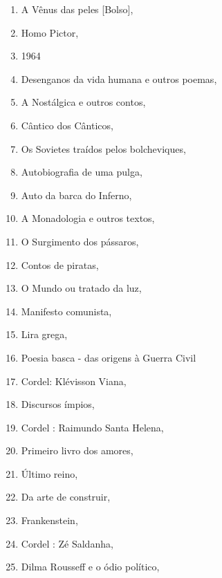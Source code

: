 \begin{multicols}{2}
\begin{enumerate}
\item A Vênus das peles [Bolso], {}
\item Homo Pictor, {}
\item 1964
\item Desenganos da vida humana e outros poemas, {}
\item A Nostálgica e outros contos, {}
\item Cântico dos Cânticos, {}
\item Os Sovietes traídos pelos bolcheviques, {}
\item Autobiografia de uma pulga, {}
\item Auto da barca do Inferno, {}
\item A Monadologia e outros textos, {}
\item O Surgimento dos pássaros, {}
\item Contos de piratas, {}
\item O Mundo ou tratado da luz, {}
\item Manifesto comunista, {}
\item Lira grega, {}
\item Poesia basca - das origens à Guerra Civil
\item Cordel: Klévisson Viana, {}
\item Discursos ímpios, {}
\item Cordel : Raimundo Santa Helena, {}
\item Primeiro livro dos amores, {}
\item Último reino, {}
\item Da arte de construir, {}
\item Frankenstein, {}
\item Cordel : Zé Saldanha, {}
\item Dilma Rousseff e o ódio político, {}

\end{enumerate}
\end{multicols}
